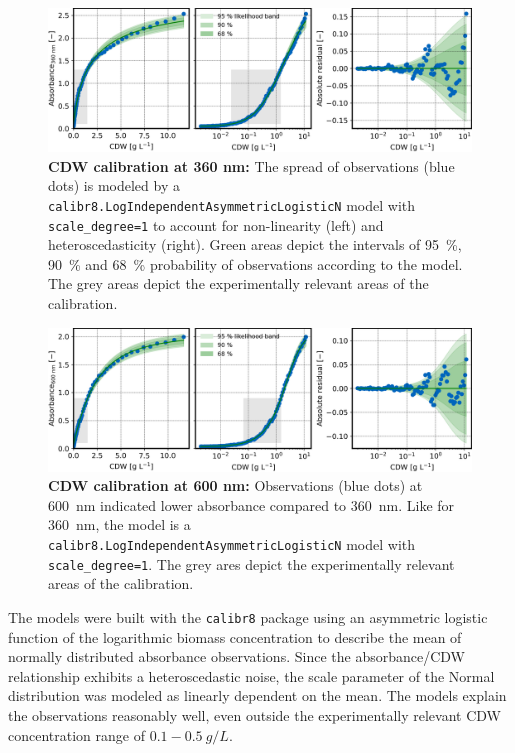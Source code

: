 \documentclass[sn-standardnature]{sn-jnl}%
\theoremstyle{thmstyleone}%
\theoremstyle{thmstyletwo}%
\theoremstyle{thmstylethree}%
\begin{document}
\begin{figure}[H]
    \centering
    \includegraphics[width=1.0\textwidth]{figures/cm_biomass_A360.png}
    \caption{
        \textbf{CDW calibration at 360 nm:}
        The spread of observations (blue dots) is modeled by a \texttt{calibr8.LogIndependentAsymmetricLogisticN} model with \texttt{scale\_degree=1} to account for non-linearity (left) and heteroscedasticity (right). 
        Green areas depict the intervals of 95~\%, 90~\% and 68~\% probability of observations according to the model. The grey areas depict the experimentally relevant areas of the calibration.
    }
    \label{fig_cmXA360}
\end{figure}

\begin{figure}[H]
    \centering
    \includegraphics[width=1.0\textwidth]{figures/cm_biomass_A600.png}
    \caption{
        \textbf{CDW calibration at 600 nm:}
        Observations (blue dots) at 600~nm indicated lower absorbance compared to 360~nm. Like for 360~nm, the model is a \texttt{calibr8.LogIndependentAsymmetricLogisticN} model with \texttt{scale\_degree=1}.
        The grey ares depict the experimentally relevant areas of the calibration.
    }
    \label{fig_cmXA600}
\end{figure}

The models were built with the \texttt{calibr8} package \cite{calibr8,calibr8Paper} using an asymmetric logistic function of the logarithmic biomass concentration to describe the mean of normally distributed absorbance observations.
Since the absorbance/CDW relationship exhibits a heteroscedastic noise, the scale parameter of the Normal distribution was modeled as linearly dependent on the mean.
The models explain the observations reasonably well, even outside the experimentally relevant CDW concentration range of $0.1-0.5~g/L$.
\end{document}
